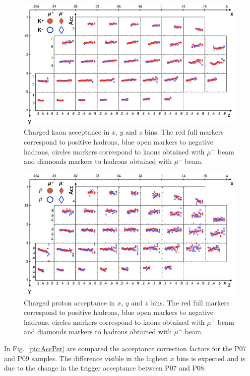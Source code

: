 \begin{figure}
  \centering
	\includegraphics[scale=0.6]{./gfx/AccK.png}
	\caption{Charged kaon acceptance in $x$, $y$ and $z$ bins. The red full markers correspond to positive hadrons, blue open markers to negative hadrons, circles markers correspond to kaons obtained with $\mu^+$ beam and diamonds markers to hadrons obtained with $\mu^-$ beam.}
	\label{pic:AccK}
\end{figure}

\begin{figure}
  \centering
	\includegraphics[scale=0.5]{./gfx/AccP.png}
	\caption{Charged proton acceptance in $x$, $y$ and $z$ bins. The red full markers correspond to positive hadrons, blue open markers to negative hadrons, circles markers correspond to kaons obtained with $\mu^+$ beam and diamonds markers to hadrons obtained with $\mu^-$ beam.}
	\label{pic:AccP}
\end{figure}

In Fig.~\ref{pic:AccPer} are compared the acceptance correction factors for the P$07$ and P$09$ samples. The difference visible in the highest $x$ bins is expected and is due to the change in the trigger acceptance between P$07$ and P$08$.

